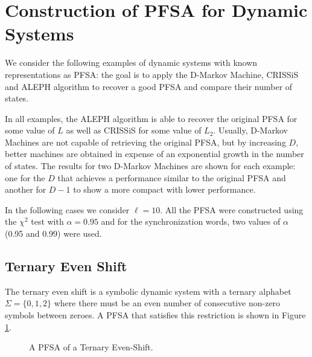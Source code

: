 {\section{Construction of PFSA for Dynamic Systems}\label{sec:testcases}

We consider the following examples of dynamic systems with known representations as PFSA: the goal is to apply the D-Markov Machine, CRISSiS and ALEPH  algorithm to recover a good PFSA and compare their number of states.

In all examples, the ALEPH algorithm is able to recover the original PFSA for some value of $L$ as well as CRISSiS for some value of $L_2$.  Usually, D-Markov Machines are not capable of retrieving the original PFSA, but by increasing $D$, better machines are obtained in expense of an exponential growth in the number of states. The results for two D-Markov Machines are shown for each example: one for the $D$ that achieves a performance similar to the original PFSA and another for $D-1$ to show a more compact with lower performance.

In the following cases we consider $\ell=10$. All the PFSA were constructed using the $\chi^2$ test with $\alpha = 0.95$ and for the synchronization words, two values of $\alpha$ (0.95 and 0.99) were used.

\subsection{Ternary Even Shift}\label{sec:terneven}

The ternary even shift is a symbolic dynamic system with a ternary alphabet $\Sigma = \{0,1,2\}$ where there must be an even number of consecutive non-zero symbols between zeroes. A PFSA that satisfies this restriction is shown in Figure \ref{fig:ternaryeven}. 

\begin{figure}
\centering
{}
\caption{A PFSA of a Ternary Even-Shift.\label{fig:ternaryeven}}
\end{figure}

}
